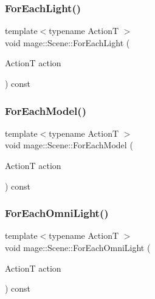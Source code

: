\hypertarget{classmage_1_1_scene_a131c27235c6f172a316c56fea7f2e80c}{}\label{classmage_1_1_scene_a131c27235c6f172a316c56fea7f2e80c} 
\subsubsection{\texorpdfstring{For\+Each\+Light()}{ForEachLight()}}
{\footnotesize\ttfamily template$<$typename ActionT $>$ \\
void mage\+::\+Scene\+::\+For\+Each\+Light (\begin{DoxyParamCaption}\item[{ActionT}]{action }\end{DoxyParamCaption}) const}

\hypertarget{classmage_1_1_scene_a6327548021f874f22a1adc81cfc8a1ea}{}\label{classmage_1_1_scene_a6327548021f874f22a1adc81cfc8a1ea} 
\subsubsection{\texorpdfstring{For\+Each\+Model()}{ForEachModel()}}
{\footnotesize\ttfamily template$<$typename ActionT $>$ \\
void mage\+::\+Scene\+::\+For\+Each\+Model (\begin{DoxyParamCaption}\item[{ActionT}]{action }\end{DoxyParamCaption}) const}

\hypertarget{classmage_1_1_scene_acd71cef84ec39e63852d5918c7b17863}{}\label{classmage_1_1_scene_acd71cef84ec39e63852d5918c7b17863} 
\subsubsection{\texorpdfstring{For\+Each\+Omni\+Light()}{ForEachOmniLight()}}
{\footnotesize\ttfamily template$<$typename ActionT $>$ \\
void mage\+::\+Scene\+::\+For\+Each\+Omni\+Light (\begin{DoxyParamCaption}\item[{ActionT}]{action }\end{DoxyParamCaption}) const}


